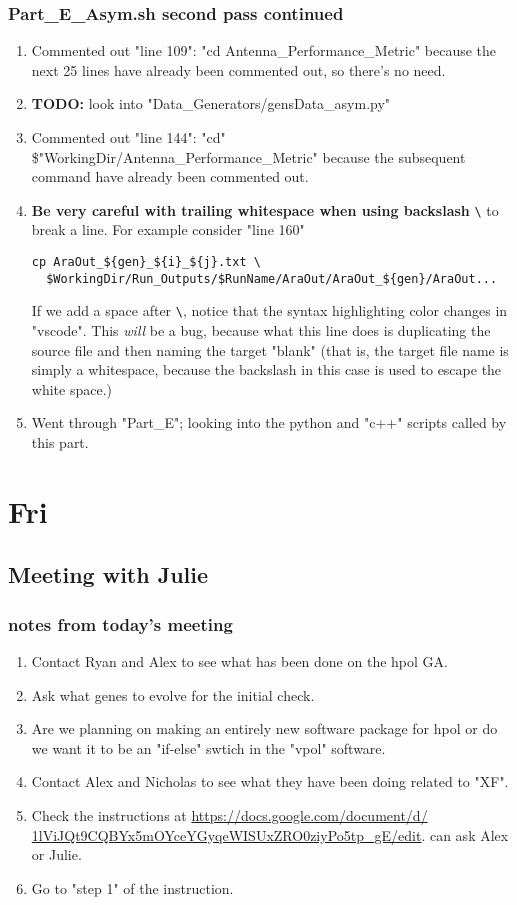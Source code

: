 \documentclass[12pt,letterpaper]{article}
\begin{document}
\subsubsection{Part\_E\_Asym.sh second pass continued}
\begin{enumerate}
  \item Commented out "line 109": "cd Antenna_Performance_Metric" because the
    next 25 lines have already been commented out, so there's no need.
  \item \textbf{TODO:} look into "Data_Generators/gensData_asym.py"
  \item Commented out "line 144": "cd" \$"WorkingDir/Antenna_Performance_Metric" because
    the subsequent command have already been commented out.
  \item \textbf{Be very careful with trailing whitespace when using backslash}
    \verb|\| to break a line. For example consider "line 160"
    \begin{verbatim}
cp AraOut_${gen}_${i}_${j}.txt \
  $WorkingDir/Run_Outputs/$RunName/AraOut/AraOut_${gen}/AraOut...
    \end{verbatim}
    If we add a space after \verb|\|, notice that the syntax highlighting color
    changes in "vscode". This \textit{will} be a bug, because what this line does is
    duplicating the source file and then naming the target "blank" (that is, the target
    file name is simply a whitespace, because the backslash in this case is used to
    escape the white space.)
  \item Went through "Part_E"; looking into the python and "c++" scripts called by
    this part.
\end{enumerate}

\section{Fri}
\subsection{Meeting with Julie}
\subsubsection{notes from today's meeting}
\begin{enumerate}
  \item Contact Ryan and Alex to see what has been done on the hpol GA.
  \item Ask what genes to evolve for the initial check.
  \item Are we planning on making an entirely new software package for hpol or
    do we want it to be an "if-else" swtich in the "vpol" software.
  \item Contact Alex and Nicholas to see what they have been doing related to "XF".
  \item Check the instructions at
    \url{https://docs.google.com/document/d/
    1lViJQt9CQBYx5mOYceYGyqeWISUxZRO0ziyPo5tp_gE/edit}.
    can ask Alex or Julie.
  \item Go to "step 1" of the instruction.
\end{enumerate}
\end{document}
